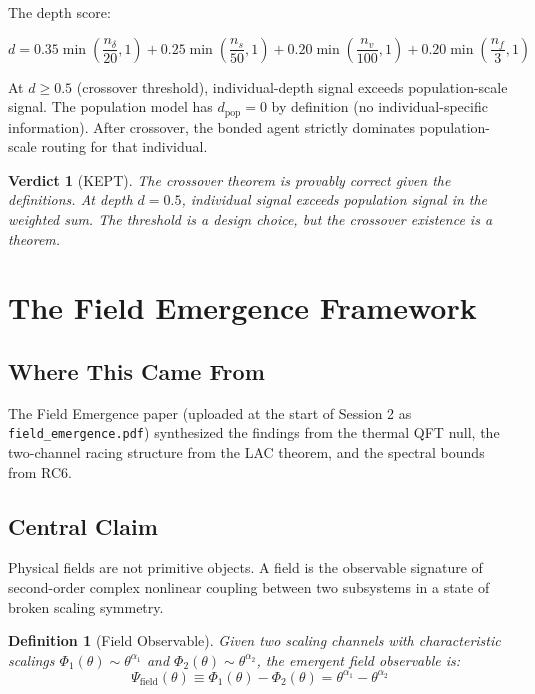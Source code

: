 \documentclass[11pt]{article}
\newtheorem{definition}{Definition}
\newtheorem{verdict}{Verdict}
\begin{document}
The depth score:

\begin{equation}
  d = 0.35 \min\!\left(\frac{n_\delta}{20}, 1\right) + 0.25 \min\!\left(\frac{n_s}{50}, 1\right) + 0.20 \min\!\left(\frac{n_v}{100}, 1\right) + 0.20 \min\!\left(\frac{n_f}{3}, 1\right)
\end{equation}

At $d \geq 0.5$ (crossover threshold), individual-depth signal exceeds population-scale signal. The population model has $d_{\text{pop}} = 0$ by definition (no individual-specific information). After crossover, the bonded agent strictly dominates population-scale routing for that individual.

\begin{verdict}[\textcolor{keepgreen}{KEPT}]
The crossover theorem is provably correct given the definitions. At depth $d = 0.5$, individual signal exceeds population signal in the weighted sum. The threshold is a design choice, but the crossover existence is a theorem.
\end{verdict}

\section{The Field Emergence Framework}
\label{sec:field}

\subsection{Where This Came From}

The Field Emergence paper (uploaded at the start of Session 2 as \texttt{field\_emergence.pdf}) synthesized the findings from the thermal QFT null, the two-channel racing structure from the LAC theorem, and the spectral bounds from RC6.

\subsection{Central Claim}

Physical fields are not primitive objects. A field is the observable signature of second-order complex nonlinear coupling between two subsystems in a state of broken scaling symmetry.

\begin{definition}[Field Observable]
Given two scaling channels with characteristic scalings $\Phi_1(\theta) \sim \theta^{\alpha_1}$ and $\Phi_2(\theta) \sim \theta^{\alpha_2}$, the emergent field observable is:
\begin{equation}
  \Psi_{\text{field}}(\theta) \equiv \Phi_1(\theta) - \Phi_2(\theta) = \theta^{\alpha_1} - \theta^{\alpha_2}
\end{equation}
\end{definition}
\end{document}
